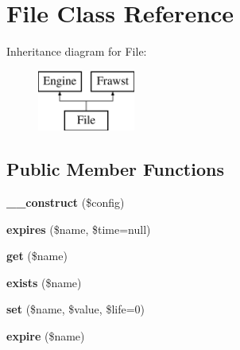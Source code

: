 \hypertarget{classFile}{
\section{File Class Reference}
\label{classFile}
}
Inheritance diagram for File:\begin{figure}[H]
\begin{center}
\leavevmode
\includegraphics[height=2.000000cm]{classFile}
\end{center}
\end{figure}
\subsection*{Public Member Functions}
\begin{DoxyCompactItemize}
\item 
\hypertarget{classFile_a3c5141c5b72735f659cce3064b3a1218}{
{\bfseries \_\-\_\-construct} (\$config)}
\label{classFile_a3c5141c5b72735f659cce3064b3a1218}

\item 
\hypertarget{classFile_a8602a61364522be0f302e5a575a463db}{
{\bfseries expires} (\$name, \$time=null)}
\label{classFile_a8602a61364522be0f302e5a575a463db}

\item 
\hypertarget{classFile_a8253df2fba95c58851bc17e4f2dfd8d9}{
{\bfseries get} (\$name)}
\label{classFile_a8253df2fba95c58851bc17e4f2dfd8d9}

\item 
\hypertarget{classFile_a0f2b2116dd84ea00f15b86fa092263dd}{
{\bfseries exists} (\$name)}
\label{classFile_a0f2b2116dd84ea00f15b86fa092263dd}

\item 
\hypertarget{classFile_ada4df03846cee49c65296f7bd518bd3b}{
{\bfseries set} (\$name, \$value, \$life=0)}
\label{classFile_ada4df03846cee49c65296f7bd518bd3b}

\item 
\hypertarget{classFile_a9ec653c0f732bf4af8405b0ce82a040b}{
{\bfseries expire} (\$name)}
\label{classFile_a9ec653c0f732bf4af8405b0ce82a040b}

\end{DoxyCompactItemize}
